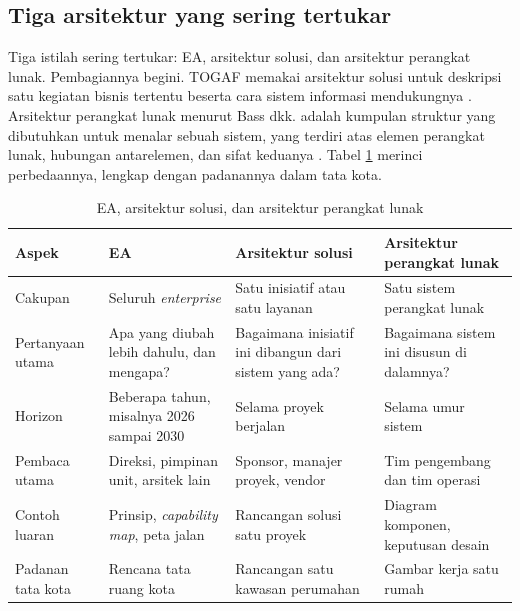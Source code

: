 \subsection*{Tiga arsitektur yang sering tertukar}

Tiga istilah sering tertukar: EA, arsitektur solusi, dan arsitektur perangkat
lunak. Pembagiannya begini. TOGAF memakai arsitektur solusi untuk deskripsi
satu kegiatan bisnis tertentu beserta cara sistem informasi mendukungnya
\cite{togaf10}. Arsitektur perangkat lunak menurut Bass dkk. adalah kumpulan
struktur yang dibutuhkan untuk menalar sebuah sistem, yang terdiri atas elemen
perangkat lunak, hubungan antarelemen, dan sifat keduanya \cite{c01-bass2021}.
Tabel \ref{tab:ch01-tiga-arsitektur} merinci perbedaannya, lengkap dengan
padanannya dalam tata kota.

\begin{table}[!htb]
  \centering
  \caption{EA, arsitektur solusi, dan arsitektur perangkat lunak}
  \label{tab:ch01-tiga-arsitektur}
  \footnotesize
  \begin{tabularx}{\textwidth}{>{\raggedright\arraybackslash}p{1.9cm}
      >{\raggedright\arraybackslash}X >{\raggedright\arraybackslash}X
      >{\raggedright\arraybackslash}X}
    \hline
    \textbf{Aspek} & \textbf{EA} & \textbf{Arsitektur solusi} & \textbf{Arsitektur perangkat lunak} \\
    \hline
    Cakupan & Seluruh \textit{enterprise} & Satu inisiatif atau satu layanan & Satu sistem perangkat lunak \\
    \hline
    Pertanyaan utama & Apa yang diubah lebih dahulu, dan mengapa? & Bagaimana inisiatif ini dibangun dari sistem yang ada? & Bagaimana sistem ini disusun di dalamnya? \\
    \hline
    Horizon & Beberapa tahun, misalnya 2026 sampai 2030 & Selama proyek berjalan & Selama umur sistem \\
    \hline
    Pembaca utama & Direksi, pimpinan unit, arsitek lain & Sponsor, manajer proyek, vendor & Tim pengembang dan tim operasi \\
    \hline
    Contoh luaran & Prinsip, \textit{capability map}, peta jalan & Rancangan solusi satu proyek & Diagram komponen, keputusan desain \\
    \hline
    Padanan tata kota & Rencana tata ruang kota & Rancangan satu kawasan perumahan & Gambar kerja satu rumah \\
    \hline
  \end{tabularx}
\end{table}

